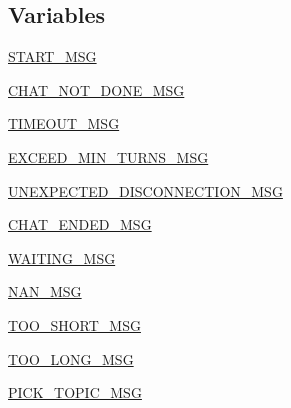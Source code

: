 \subsection*{Variables}
\begin{DoxyCompactItemize}
\item 
\hyperlink{namespaceprojects_1_1wizard__of__wikipedia_1_1mturk__evaluation__task_1_1worlds_aca4a272be0b82cb68c711134eb37c65a}{S\+T\+A\+R\+T\+\_\+\+M\+SG}
\item 
\hyperlink{namespaceprojects_1_1wizard__of__wikipedia_1_1mturk__evaluation__task_1_1worlds_afafb44a76af020fece5722aaff7935eb}{C\+H\+A\+T\+\_\+\+N\+O\+T\+\_\+\+D\+O\+N\+E\+\_\+\+M\+SG}
\item 
\hyperlink{namespaceprojects_1_1wizard__of__wikipedia_1_1mturk__evaluation__task_1_1worlds_acbef36cf914969582f58646cc29a4605}{T\+I\+M\+E\+O\+U\+T\+\_\+\+M\+SG}
\item 
\hyperlink{namespaceprojects_1_1wizard__of__wikipedia_1_1mturk__evaluation__task_1_1worlds_aa5b83b681446f276dd3fb7f8578260a1}{E\+X\+C\+E\+E\+D\+\_\+\+M\+I\+N\+\_\+\+T\+U\+R\+N\+S\+\_\+\+M\+SG}
\item 
\hyperlink{namespaceprojects_1_1wizard__of__wikipedia_1_1mturk__evaluation__task_1_1worlds_a883038870b597a71b92ae675e1ef762c}{U\+N\+E\+X\+P\+E\+C\+T\+E\+D\+\_\+\+D\+I\+S\+C\+O\+N\+N\+E\+C\+T\+I\+O\+N\+\_\+\+M\+SG}
\item 
\hyperlink{namespaceprojects_1_1wizard__of__wikipedia_1_1mturk__evaluation__task_1_1worlds_a6d5acb1c3c52987feef0cd88f71e7fbb}{C\+H\+A\+T\+\_\+\+E\+N\+D\+E\+D\+\_\+\+M\+SG}
\item 
\hyperlink{namespaceprojects_1_1wizard__of__wikipedia_1_1mturk__evaluation__task_1_1worlds_af44d380fea0f0dd3dff528bce929af69}{W\+A\+I\+T\+I\+N\+G\+\_\+\+M\+SG}
\item 
\hyperlink{namespaceprojects_1_1wizard__of__wikipedia_1_1mturk__evaluation__task_1_1worlds_a4ada9aded7af0ae3a4c7998e1ea77211}{N\+A\+N\+\_\+\+M\+SG}
\item 
\hyperlink{namespaceprojects_1_1wizard__of__wikipedia_1_1mturk__evaluation__task_1_1worlds_aaa02830fef4be5475aec1076b258b9d1}{T\+O\+O\+\_\+\+S\+H\+O\+R\+T\+\_\+\+M\+SG}
\item 
\hyperlink{namespaceprojects_1_1wizard__of__wikipedia_1_1mturk__evaluation__task_1_1worlds_aa02af7f206b64b3892ee69c9c5c7ff9a}{T\+O\+O\+\_\+\+L\+O\+N\+G\+\_\+\+M\+SG}
\item 
\hyperlink{namespaceprojects_1_1wizard__of__wikipedia_1_1mturk__evaluation__task_1_1worlds_a8a17205f0df1d6a9817ff8bc373dabc1}{P\+I\+C\+K\+\_\+\+T\+O\+P\+I\+C\+\_\+\+M\+SG}

\end{DoxyCompactItemize}
